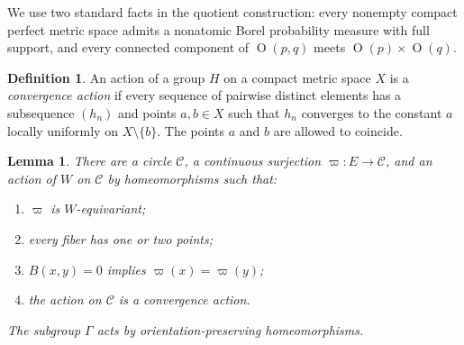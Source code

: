 \documentclass[11pt,reqno]{amsart}
\theoremstyle{plain}
\newtheorem{lemma}[theorem]{Lemma}
\theoremstyle{definition}
\newtheorem{definition}[theorem]{Definition}
\theoremstyle{remark}
\numberwithin{equation}{section}
\begin{document}
We use two standard facts in the quotient construction: every nonempty compact perfect metric space admits a nonatomic Borel probability measure with full support, and every connected component of $\operatorname{O}(p,q)$ meets $\operatorname{O}(p)\times\operatorname{O}(q)$.

\begin{definition}
An action of a group $H$ on a compact metric space $X$ is a \emph{convergence action} if every sequence of pairwise distinct elements has a subsequence $(h_n)$ and points $a,b\in X$ such that $h_n$ converges to the constant $a$ locally uniformly on $X\setminus\{b\}$. The points $a$ and $b$ are allowed to coincide.
\end{definition}

\begin{lemma}\label{lem:23-quotient-circle}
There are a circle $\mathcal C$, a continuous surjection $\varpi:E\to\mathcal C$, and an action of $W$ on $\mathcal C$ by homeomorphisms such that:
\begin{enumerate}
\item $\varpi$ is $W$-equivariant;
\item every fiber has one or two points;
\item $B(x,y)=0$ implies $\varpi(x)=\varpi(y)$;
\item the action on $\mathcal C$ is a convergence action.
\end{enumerate}
The subgroup $\Gamma$ acts by orientation-preserving homeomorphisms.
\end{lemma}
\end{document}
